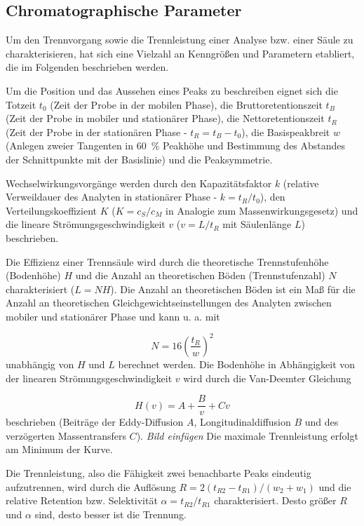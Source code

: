   \subsection{Chromatographische Parameter}
    
    Um den Trennvorgang sowie die Trennleistung einer Analyse bzw. einer Säule zu charakterisieren, hat sich eine Vielzahl an Kenngrößen und Parametern etabliert, die im Folgenden beschrieben werden.
    
     Um die Position und das Aussehen eines Peaks zu beschreiben eignet sich die Totzeit $t_0$ (Zeit der Probe in der mobilen Phase), die Bruttoretentionszeit $t_B$ (Zeit der Probe in mobiler und stationärer Phase), die Nettoretentionszeit $t_R$ (Zeit der Probe in der stationären Phase - $t_R = t_B - t_0$), die Basispeakbreit $w$ (Anlegen zweier Tangenten in \SI[mode=text]{60}{\percent} Peakhöhe und Bestimmung des Abstandes der Schnittpunkte mit der Basislinie) und die Peaksymmetrie. 
    
    Wechselwirkungsvorgänge werden durch den Kapazitätsfaktor $k$ (relative Verweildauer des Analyten in stationärer Phase - $k = t_R / t_0$), den Verteilungskoeffizient $K$ ($K = c_S / c_M$ in Analogie zum Massenwirkungsgesetz) und die lineare Strömungsgeschwindigkeit $v$ ($v = L / t_R$ mit Säulenlänge $L$) beschrieben. 
    
    Die Effizienz einer Trennsäule wird durch die theoretische Trennstufenhöhe (Bodenhöhe) $H$ und die Anzahl an theoretischen Böden (Trennstufenzahl) $N$ charakterisiert ($L = N H$). Die Anzahl an theoretischen Böden ist ein Maß für die Anzahl an theoretischen Gleichgewichtseinstellungen des Analyten zwischen mobiler und stationärer Phase und kann u. a. mit 
    
      \begin{equation}
        N = 16 \left(\frac{t_R}{w}\right)^2
      \end{equation} 
    unabhängig von $H$ und $L$ berechnet werden. Die Bodenhöhe in Abhängigkeit von der linearen Strömungsgeschwindigkeit $v$ wird durch die Van-Deemter Gleichung 
    
      \begin{equation}
        H(v) = A + \frac{B}{v} + C v
      \end{equation}
    beschrieben (Beiträge der Eddy-Diffusion $A$, Longitudinaldiffusion $B$ und des verzögerten Massentransfers $C$). \textit{Bild einfügen} Die maximale Trennleistung erfolgt am Minimum der Kurve. 
    
    Die Trennleistung, also die Fähigkeit zwei benachbarte Peaks eindeutig aufzutrennen, wird durch die Auflösung $R = 2\left(t_{R2} - t_{R1}\right) / \left(w_2 + w_1\right)$ und die relative Retention bzw. Selektivität $\alpha = t_{R2} / t_{R1}$ charakterisiert. Desto größer $R$ und $\alpha$ sind, desto  besser ist die Trennung. \citep{Versuchsvorschrift}
    

